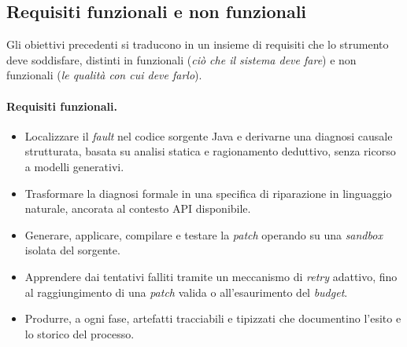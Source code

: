 \subsection{Requisiti funzionali e non funzionali}
Gli obiettivi precedenti si traducono in un insieme di requisiti che lo strumento deve soddisfare,
distinti in funzionali (\textit{ciò che il sistema deve fare}) e non funzionali (\textit{le qualità con
cui deve farlo}).

\paragraph{Requisiti funzionali.}
\begin{itemize}
    \item[\textbf{RF1}] Localizzare il \textit{fault} nel codice sorgente Java e derivarne una diagnosi
    causale strutturata, basata su analisi statica e ragionamento deduttivo, senza ricorso a modelli
    generativi.
    \item[\textbf{RF2}] Trasformare la diagnosi formale in una specifica di riparazione in linguaggio
    naturale, ancorata al contesto API disponibile.
    \item[\textbf{RF3}] Generare, applicare, compilare e testare la \textit{patch} operando su una
    \textit{sandbox} isolata del sorgente.
    \item[\textbf{RF4}] Apprendere dai tentativi falliti tramite un meccanismo di \textit{retry}
    adattivo, fino al raggiungimento di una \textit{patch} valida o all'esaurimento del \textit{budget}.
    \item[\textbf{RF5}] Produrre, a ogni fase, artefatti tracciabili e tipizzati che documentino l'esito e lo
    storico del processo.
\end{itemize}

